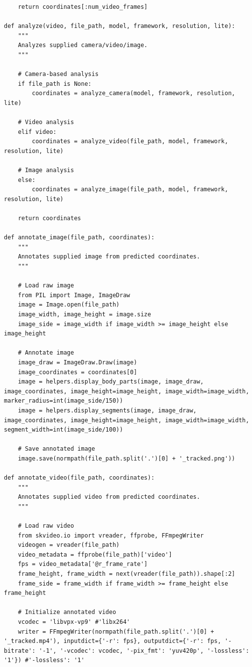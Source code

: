 \documentclass{fisatprojectfinal}
\begin{document}
\begin{appendices}
\begin{lstlisting}
    return coordinates[:num_video_frames]

def analyze(video, file_path, model, framework, resolution, lite):
    """
    Analyzes supplied camera/video/image.
    """
    
    # Camera-based analysis
    if file_path is None:
        coordinates = analyze_camera(model, framework, resolution, lite)
    
    # Video analysis
    elif video:
        coordinates = analyze_video(file_path, model, framework, resolution, lite)
    
    # Image analysis
    else:
        coordinates = analyze_image(file_path, model, framework, resolution, lite)
    
    return coordinates

def annotate_image(file_path, coordinates):
    """
    Annotates supplied image from predicted coordinates.
    """
    
    # Load raw image
    from PIL import Image, ImageDraw
    image = Image.open(file_path)
    image_width, image_height = image.size
    image_side = image_width if image_width >= image_height else image_height

    # Annotate image
    image_draw = ImageDraw.Draw(image)
    image_coordinates = coordinates[0]
    image = helpers.display_body_parts(image, image_draw, image_coordinates, image_height=image_height, image_width=image_width, marker_radius=int(image_side/150))
    image = helpers.display_segments(image, image_draw, image_coordinates, image_height=image_height, image_width=image_width, segment_width=int(image_side/100))
    
    # Save annotated image
    image.save(normpath(file_path.split('.')[0] + '_tracked.png'))
    
def annotate_video(file_path, coordinates):
    """
    Annotates supplied video from predicted coordinates.
    """
    
    # Load raw video
    from skvideo.io import vreader, ffprobe, FFmpegWriter
    videogen = vreader(file_path)
    video_metadata = ffprobe(file_path)['video']
    fps = video_metadata['@r_frame_rate']
    frame_height, frame_width = next(vreader(file_path)).shape[:2]
    frame_side = frame_width if frame_width >= frame_height else frame_height

    # Initialize annotated video
    vcodec = 'libvpx-vp9' #'libx264'
    writer = FFmpegWriter(normpath(file_path.split('.')[0] + '_tracked.mp4'), inputdict={'-r': fps}, outputdict={'-r': fps, '-bitrate': '-1', '-vcodec': vcodec, '-pix_fmt': 'yuv420p', '-lossless': '1'}) #'-lossless': '1'
 

\end{lstlisting}
\end{appendices}
\end{document}

